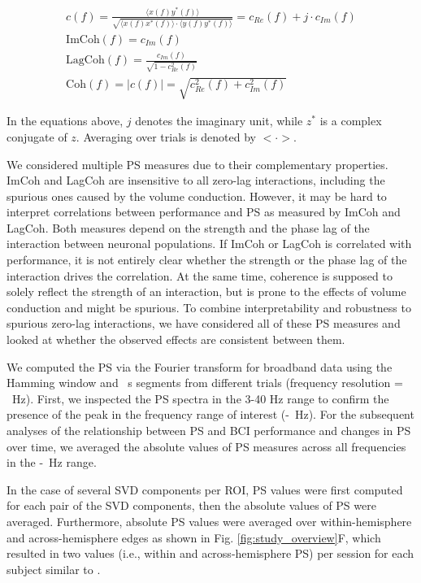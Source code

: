\begin{gather}
    c(f) = \frac{\langle x(f) y^*(f) \rangle}{\sqrt{\langle x(f) x^*(f) \rangle \cdot \langle y(f) y^*(f) \rangle}} = c_{Re}(f) + j \cdot c_{Im}(f) \\[0.15cm]
    \text{ImCoh}(f) = c_{Im}(f) \\[0.15cm]
    \text{LagCoh}(f) = \frac{c_{Im}(f)}{\sqrt{1 - c_{Re}^2(f)}} \\[0.15cm]
    \text{Coh}(f) = |c(f)| = \sqrt{c_{Re}^2(f) + c_{Im}^2(f)}
\end{gather}

In the equations above, $j$ denotes the imaginary unit, while $z^*$ is a complex conjugate of $z$. Averaging over trials is denoted by $<\cdot>$.

\medskip

We considered multiple PS measures due to their complementary properties. ImCoh and LagCoh are insensitive to all zero-lag interactions, including the spurious ones caused by the volume conduction. However, it may be hard to interpret correlations between performance and PS as measured by ImCoh and LagCoh. Both measures depend on the strength and the phase lag of the interaction between neuronal populations. If ImCoh or LagCoh is correlated with performance, it is not entirely clear whether the strength or the phase lag of the interaction drives the correlation. At the same time, coherence is supposed to solely reflect the strength of an interaction, but is prone to the effects of volume conduction and might be spurious. To combine interpretability and robustness to spurious zero-lag interactions, we have considered all of these PS measures and looked at whether the observed effects are consistent between them.

\medskip

We computed the PS via the Fourier transform for broadband data using the Hamming window and \fftSegLength~s segments from different trials (frequency resolution = \fftFreqRes~Hz). First, we inspected the PS spectra in the 3-40 Hz range to confirm the presence of the peak in the frequency range of interest (\muLow-\muHigh~Hz). For the subsequent analyses of the relationship between PS and BCI performance and changes in PS over time, we averaged the absolute values of PS measures across all frequencies in the \muLow-\muHigh~Hz range.

\medskip

In the case of several SVD components per ROI, PS values were first computed for each pair of the SVD components, then the absolute values of PS were averaged. Furthermore, absolute PS values were averaged over within-hemisphere and across-hemisphere edges as shown in Fig. \ref{fig:study_overview}F, which resulted in two values (i.e., within and across-hemisphere PS) per session for each subject similar to \citep{Vidaurre2020}.

